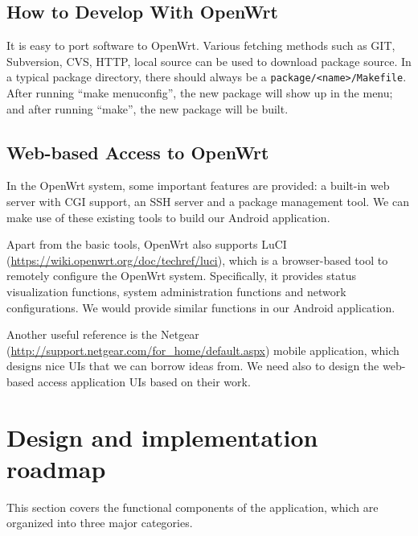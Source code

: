 \documentclass{sig-alternate-05-2015}
\begin{document}
	\subsection{How to Develop With OpenWrt}
	
	It is easy to port software to OpenWrt. Various fetching methods such as GIT, Subversion, CVS, HTTP, local source can be used to download package source. In a typical package directory, there should always be a \verb|package/<name>/Makefile|. After running ``make menuconfig'', the new package will show up in the menu; and after running ``make'', the new package will be built.
	
	\subsection{Web-based Access to OpenWrt}
	In the OpenWrt system, some important features are provided: a built-in web server with CGI support, an SSH server and a package management tool. We can make use of these existing tools to build our Android application.
	
	Apart from the basic tools, OpenWrt also supports LuCI (\url {https://wiki.openwrt.org/doc/techref/luci}), which is a browser-based tool to remotely configure the OpenWrt system. Specifically, it provides status visualization functions, system administration functions and network configurations. We would provide similar functions in our Android application.
	
	Another useful reference is the Netgear (\url{http://support.netgear.com/for_home/default.aspx}) mobile application, which designs nice UIs that we can borrow ideas from. We need also to design the web-based access application UIs based on their work.
	
	\section{Design and implementation \\ roadmap}
	
	This section covers the functional components of the application, which are organized into three major categories.
	
\end{document}
